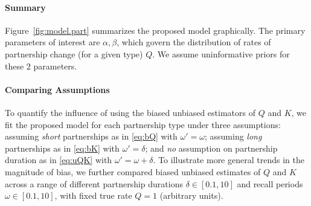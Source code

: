 \paragraph{Summary}
Figure~\ref{fig:model.part} summarizes the proposed model graphically.
The primary parameters of interest are $\alpha, \beta$, which govern
the distribution of rates of partnership change (for a given type) $Q$.
We assume uninformative priors for these 2 parameters.
\paragraph{Comparing Assumptions}
To quantify the influence of using
the biased \vs unbiased estimators of $Q$ and $K$,
we fit the proposed model for each partnership type under three assumptions:
assuming \emph{short} partnerships as in \eqref{eq:bQ} with $\omega' = \omega$;
assuming \emph{long} partnerships as in \eqref{eq:bK} with $\omega' = \delta$; and
\emph{no} assumption on partnership duration as in \eqref{eq:uQK} with $\omega' = \omega + \delta$.
To illustrate more general trends in the magnitude of bias,
we further compared biased \vs unbiased estimates of $Q$ and $K$ across a range of different
partnership durations $\delta \in [0.1, 10]$ and
recall periods $\omega \in [0.1, 10]$,
with fixed true rate $Q = 1$ (arbitrary units).
